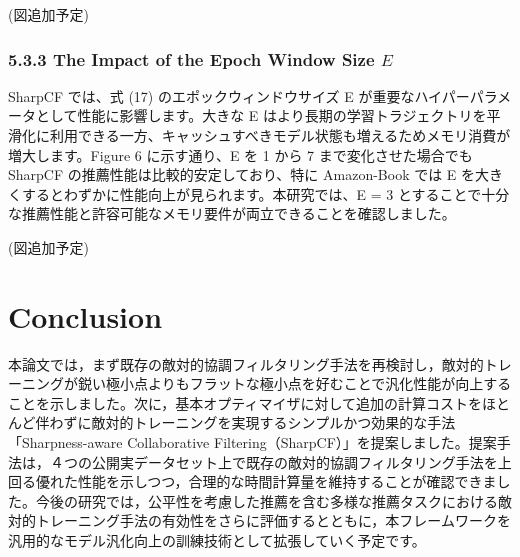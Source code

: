 \documentclass[11pt,a4paper]{article}
\begin{document}
(図追加予定)

\subsubsection{5.3.3 The Impact of the Epoch Window Size $E$}
SharpCF では、式 (17) のエポックウィンドウサイズ E が重要なハイパーパラメータとして性能に影響します。大きな E はより長期の学習トラジェクトリを平滑化に利用できる一方、キャッシュすべきモデル状態も増えるためメモリ消費が増大します。Figure 6 に示す通り、E を 1 から 7 まで変化させた場合でも SharpCF の推薦性能は比較的安定しており、特に Amazon-Book では E を大きくするとわずかに性能向上が見られます。本研究では、E = 3 とすることで十分な推薦性能と許容可能なメモリ要件が両立できることを確認しました。

(図追加予定)

\section{Conclusion}

本論文では，まず既存の敵対的協調フィルタリング手法を再検討し，敵対的トレーニングが鋭い極小点よりもフラットな極小点を好むことで汎化性能が向上することを示しました。次に，基本オプティマイザに対して追加の計算コストをほとんど伴わずに敵対的トレーニングを実現するシンプルかつ効果的な手法「Sharpness-aware Collaborative Filtering（SharpCF）」を提案しました。提案手法は，４つの公開実データセット上で既存の敵対的協調フィルタリング手法を上回る優れた性能を示しつつ，合理的な時間計算量を維持することが確認できました。今後の研究では，公平性を考慮した推薦を含む多様な推薦タスクにおける敵対的トレーニング手法の有効性をさらに評価するとともに，本フレームワークを汎用的なモデル汎化向上の訓練技術として拡張していく予定です。
\end{document}

